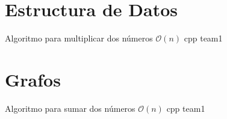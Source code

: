 \section{Estructura de Datos}

{Algoritmo para multiplicar dos números}
{$\mathcal{O}(n)$}
{cpp}{}
{team1}

\section{Grafos}

{Algoritmo para sumar dos números}
{$\mathcal{O}(n)$}
{cpp}{}
{team1}
